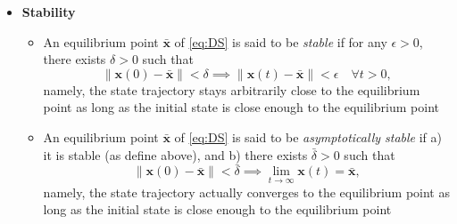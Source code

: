 \documentclass[12pt,a4paper]{article}
\begin{document}
\begin{itemize}
\item \textbf{Stability}
  \begin{itemize}
  \item An equilibrium point $\bar{\bm{x}}$ of \eqref{eq:DS}
    is said to be \emph{stable} if
    for any $\epsilon >0$,
    there exists $\delta>0$ such that
    \begin{equation}\nonumber%
      \lVert \bm{x}(0) - \bar{\bm{x}} \rVert < \delta
      \implies 
      \lVert \bm{x}(t) - \bar{\bm{x}} \rVert < \epsilon \quad \forall t> 0,
    \end{equation}
    namely, the state trajectory stays arbitrarily close to the equilibrium point
    as long as the initial state is close enough to the equilibrium point
  \item An equilibrium point $\bar{\bm{x}}$ of \eqref{eq:DS}
    is said to be \emph{asymptotically stable} if
    a) it is stable (as define above), and
    b) there exists $\bar{\delta}>0$ such that
    \begin{equation}\nonumber%
      \lVert \bm{x}(0) - \bar{\bm{x}} \rVert < \bar{\delta}
      \implies 
      \lim_{t \to \infty}\bm{x}(t) =  \bar{\bm{x}},
    \end{equation}
    namely, the state trajectory actually converges to the equilibrium point
    as long as the initial state is close enough to the equilibrium point
  \end{itemize}


\end{itemize}
\end{document}
